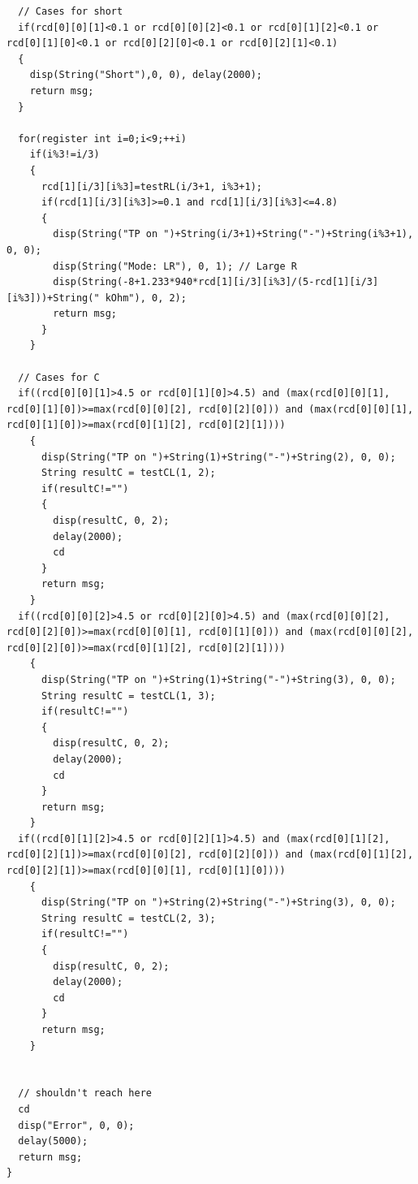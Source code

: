 \documentclass[a4paper]{article}
\begin{document}
\begin{lstlisting}
  // Cases for short
  if(rcd[0][0][1]<0.1 or rcd[0][0][2]<0.1 or rcd[0][1][2]<0.1 or rcd[0][1][0]<0.1 or rcd[0][2][0]<0.1 or rcd[0][2][1]<0.1)
  {
    disp(String("Short"),0, 0), delay(2000);
    return msg;
  }

  for(register int i=0;i<9;++i)
    if(i%3!=i/3)
    {
      rcd[1][i/3][i%3]=testRL(i/3+1, i%3+1);
      if(rcd[1][i/3][i%3]>=0.1 and rcd[1][i/3][i%3]<=4.8)
      {
        disp(String("TP on ")+String(i/3+1)+String("-")+String(i%3+1), 0, 0);
        disp(String("Mode: LR"), 0, 1); // Large R
        disp(String(-8+1.233*940*rcd[1][i/3][i%3]/(5-rcd[1][i/3][i%3]))+String(" kOhm"), 0, 2);
        return msg;
      }
    }
    
  // Cases for C
  if((rcd[0][0][1]>4.5 or rcd[0][1][0]>4.5) and (max(rcd[0][0][1], rcd[0][1][0])>=max(rcd[0][0][2], rcd[0][2][0])) and (max(rcd[0][0][1], rcd[0][1][0])>=max(rcd[0][1][2], rcd[0][2][1])))
    {
      disp(String("TP on ")+String(1)+String("-")+String(2), 0, 0);
      String resultC = testCL(1, 2);
      if(resultC!="")
      {
        disp(resultC, 0, 2);
        delay(2000);
        cd
      }
      return msg;
    }
  if((rcd[0][0][2]>4.5 or rcd[0][2][0]>4.5) and (max(rcd[0][0][2], rcd[0][2][0])>=max(rcd[0][0][1], rcd[0][1][0])) and (max(rcd[0][0][2], rcd[0][2][0])>=max(rcd[0][1][2], rcd[0][2][1])))
    {
      disp(String("TP on ")+String(1)+String("-")+String(3), 0, 0);
      String resultC = testCL(1, 3);
      if(resultC!="")
      {
        disp(resultC, 0, 2);
        delay(2000);
        cd
      }
      return msg;
    }
  if((rcd[0][1][2]>4.5 or rcd[0][2][1]>4.5) and (max(rcd[0][1][2], rcd[0][2][1])>=max(rcd[0][0][2], rcd[0][2][0])) and (max(rcd[0][1][2], rcd[0][2][1])>=max(rcd[0][0][1], rcd[0][1][0])))
    {
      disp(String("TP on ")+String(2)+String("-")+String(3), 0, 0);
      String resultC = testCL(2, 3);
      if(resultC!="")
      {
        disp(resultC, 0, 2);
        delay(2000);
        cd
      }
      return msg;
    }


  // shouldn't reach here
  cd
  disp("Error", 0, 0);
  delay(5000);
  return msg;
}
\end{lstlisting}
\end{document}
